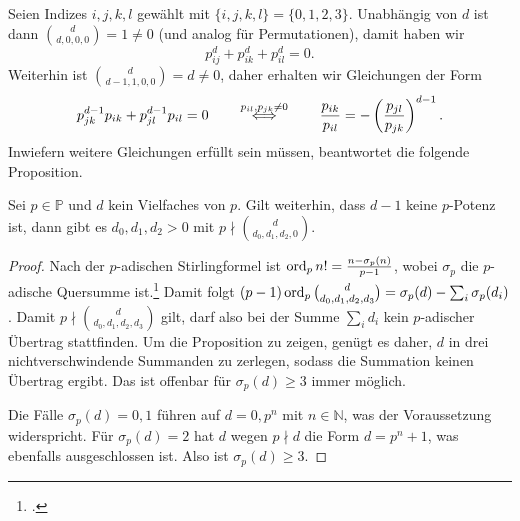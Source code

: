 Seien Indizes $i,j,k,l$ gewählt mit $\{i,j,k,l\} = \{0,1,2,3\}$. Unabhängig von $d$ ist dann $\binom d{d,0,0,0} = 1 \neq 0$ (und analog für Permutationen), damit haben wir
\begin{equation} \label{eq:powers}
p_{ij}^d + p_{ik}^d + p_{il}^d = 0.
\end{equation}
Weiterhin ist $\binom d{d-1,1,0,0} = d \neq 0$, daher erhalten wir Gleichungen der Form
\begin{equation} \label{eq:ratios}
p_{jk}^{d-1} p_{ik} + p_{jl}^{d-1} p_{il} = 0 \qquad\overrel\Longleftrightarrow^{p_{il}, p_{jk} \neq 0}\qquad \frac{p_{ik}}{p_{il}} = -\left(\frac{p_{jl}}{p_{jk}}\right)^{d-1}.
\end{equation}
Inwiefern weitere Gleichungen erfüllt sein müssen, beantwortet die folgende Proposition.
\begin{prop}
Sei $p \in \mathbb P$ und $d$ kein Vielfaches von $p$. Gilt weiterhin, dass $d-1$ keine $p$-Potenz ist, dann gibt es $d_0, d_1, d_2 > 0$ mit $p \nmid \binom d{d_0,d_1,d_2,0}$.
\end{prop}
\begin{proof}
Nach der $p$-adischen Stirlingformel ist $\operatorname{ord}_p n! = \frac{n - \sigma_p(n)}{p-1}$, wobei $\sigma_p$ die $p$-adische Quersumme ist.\footcite[Kap.~2, §8, Lemma~1, S.~171]{LieGroups} Damit folgt $(p-1)\operatorname{ord}_p \binom d{d_0,d_1,d_2,d_3} = \sigma_p(d) - \sum_i \sigma_p(d_i)$. Damit $p \nmid \binom d{d_0,d_1,d_2,d_3}$ gilt, darf also bei der Summe $\sum_i d_i$ kein $p$-adischer Übertrag stattfinden. Um die Proposition zu zeigen, genügt es daher, $d$ in drei nichtverschwindende Summanden zu zerlegen, sodass die Summation keinen Übertrag ergibt. Das ist offenbar für $\sigma_p(d) \geq 3$ immer möglich.

Die Fälle $\sigma_p(d) = 0, 1$ führen auf $d = 0, p^n$ mit $n \in \mathbb N$, was der Voraussetzung widerspricht. Für $\sigma_p(d) = 2$ hat $d$ wegen $p \nmid d$ die Form $d=p^n+1$, was ebenfalls ausgeschlossen ist. Also ist $\sigma_p(d) \geq 3$.
\end{proof}

